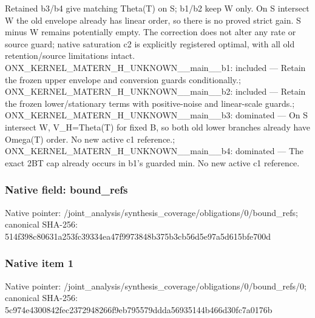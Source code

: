 \documentclass[10pt,a4paper]{article}
\begin{document}
\begingroup\raggedright\sloppy Retained b3/\allowbreak{}b4 give matching Theta(T) on S;\allowbreak{} b1/\allowbreak{}b2 keep W only. On S intersect W the old envelope already has linear order,\allowbreak{} so there is no proved strict gain. S minus W remains potentially empty. The correction does not alter any rate or source guard;\allowbreak{} native saturation c2 is explicitly registered optimal,\allowbreak{} with all old retention/\allowbreak{}source limitations intact. ONX\_\allowbreak{}KERNEL\_\allowbreak{}MATERN\_\allowbreak{}H\_\allowbreak{}UNKNOWN\_\allowbreak{}\_\allowbreak{}main\_\allowbreak{}\_\allowbreak{}b1:\allowbreak{} included {\AtlasUnicodeText —}\allowbreak{} Retain the frozen upper envelope and conversion guards conditionally.;\allowbreak{} ONX\_\allowbreak{}KERNEL\_\allowbreak{}MATERN\_\allowbreak{}H\_\allowbreak{}UNKNOWN\_\allowbreak{}\_\allowbreak{}main\_\allowbreak{}\_\allowbreak{}b2:\allowbreak{} included {\AtlasUnicodeText —}\allowbreak{} Retain the frozen lower/\allowbreak{}stationary terms with positive-noise and linear-scale guards.;\allowbreak{} ONX\_\allowbreak{}KERNEL\_\allowbreak{}MATERN\_\allowbreak{}H\_\allowbreak{}UNKNOWN\_\allowbreak{}\_\allowbreak{}main\_\allowbreak{}\_\allowbreak{}b3:\allowbreak{} dominated {\AtlasUnicodeText —}\allowbreak{} On S intersect W,\allowbreak{} V\_\allowbreak{}H=\allowbreak{}Theta(T) for fixed B,\allowbreak{} so both old lower branches already have Omega(T) order. No new active c1 reference.;\allowbreak{} ONX\_\allowbreak{}KERNEL\_\allowbreak{}MATERN\_\allowbreak{}H\_\allowbreak{}UNKNOWN\_\allowbreak{}\_\allowbreak{}main\_\allowbreak{}\_\allowbreak{}b4:\allowbreak{} dominated {\AtlasUnicodeText —}\allowbreak{} The exact 2BT cap already occurs in b1's guarded min. No new active c1 reference.\par\endgroup

\subsubsection{Native field: bound\_\allowbreak{}refs}
Native pointer: /joint\_\allowbreak{}analysis/synthesis\_\allowbreak{}coverage/obligations/0/bound\_\allowbreak{}refs; canonical SHA-256: 514f398c80631a253fc39334ea47f9973848b375b3cb56d5e97a5d615bfe700d

\subsubsection{Native item 1}
Native pointer: /joint\_\allowbreak{}analysis/synthesis\_\allowbreak{}coverage/obligations/0/bound\_\allowbreak{}refs/0; canonical SHA-256: 5c974e4300842fec2372948266f9eb795579ddda56935144b466d30fc7a0176b
\end{document}
